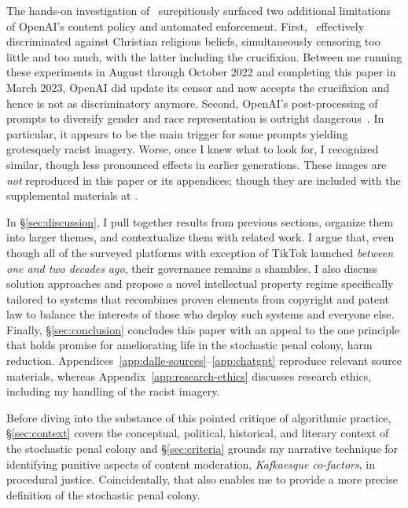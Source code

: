 The hands-on investigation of \DALLE\ surepitiously surfaced two additional
limitations of OpenAI's content policy and automated enforcement. First, \DALLE\
effectively discriminated against Christian religious beliefs, simultaneously
censoring too little and too much, with the latter including the crucifixion.
Between me running these experiments in August through October 2022 and
completing this paper in March 2023, OpenAI did update its censor and now
accepts the crucifixion and hence is not as discriminatory anymore. Second,
OpenAI's post-processing of prompts to diversify gender and race representation
is outright dangerous~\cite{OpenAI2022e,Sparkes2022}. In particular, it appears
to be the main trigger for some prompts yielding grotesquely racist imagery.
Worse, once I knew what to look for, I recognized similar, though less
pronounced effects in earlier generations. These images are \emph{not}
reproduced in this paper or its appendices; though they are included with the
supplemental materials at .

In \S\ref{sec:discussion}, I pull together results from previous sections,
organize them into larger themes, and contextualize them with related work. I
argue that, even though all of the surveyed platforms with exception of TikTok
launched \emph{between one and two decades ago}, their governance remains a
shambles. I also discuss solution approaches and propose a novel intellectual
property regime specifically tailored to \V{AI} systems that recombines proven
elements from copyright and patent law to balance the interests of those who
deploy such systems and everyone else. Finally, \S\ref{sec:conclusion} concludes
this paper with an appeal to the one principle that holds promise for
ameliorating life in the stochastic penal colony, harm reduction.
Appendices~\ref{app:dalle-sources}--\ref{app:chatgpt} reproduce relevant source
materials, whereas Appendix~\ref{app:research-ethics} discusses research ethics,
including my handling of the racist imagery.

Before diving into the substance of this pointed critique of algorithmic
practice, \S\ref{sec:context} covers the conceptual, political, historical, and
literary context of the stochastic penal colony and \S\ref{sec:criteria} grounds
my narrative technique for identifying punitive aspects of content moderation,
\emph{Kafkaesque co-factors}, in procedural justice. Coincidentally, that also
enables me to provide a more precise definition of the stochastic penal colony.


